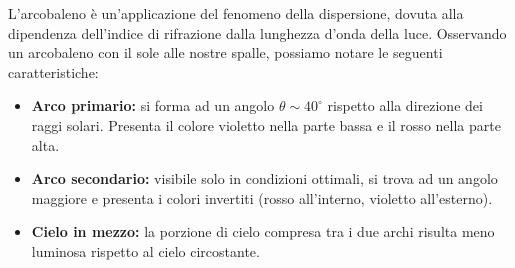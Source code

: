\documentclass[openany,a4paper,12pt]{book}
\begin{document}
L'arcobaleno è un'applicazione del fenomeno della dispersione, dovuta alla dipendenza dell'indice di rifrazione dalla lunghezza d'onda della luce. 
Osservando un arcobaleno con il sole alle nostre spalle, possiamo notare le seguenti caratteristiche:
\begin{itemize}
    \item \textbf{Arco primario:} si forma ad un angolo $\theta \sim 40^\circ$ rispetto alla direzione dei raggi solari. Presenta il colore violetto nella parte bassa e il rosso nella parte alta.
    \item \textbf{Arco secondario:} visibile solo in condizioni ottimali, si trova ad un angolo maggiore e presenta i colori invertiti (rosso all'interno, violetto all'esterno).
    \item \textbf{Cielo in mezzo:} la porzione di cielo compresa tra i due archi risulta meno luminosa rispetto al cielo circostante.
\end{itemize}
\end{document}
